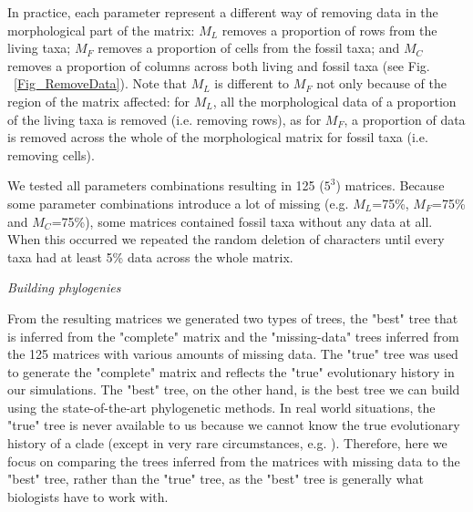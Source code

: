 \documentclass[12pt,letterpaper]{article}
\renewcommand{\subsection}[1]{%
\bigskip
\begin{center}
\begin{large}
\normalfont\itshape #1
\end{large}
\end{center}}
\begin{document}
In practice, each parameter represent a different way of removing data in the morphological part of the matrix: $M_{L}$ removes a proportion of rows from the living taxa; $M_{F}$ removes a proportion of cells from the fossil taxa; and $M_{C}$ removes a proportion of columns across both living and fossil taxa (see Fig. ~\ref{Fig_RemoveData}).
Note that $M_{L}$ is different to $M_{F}$ not only because of the region of the matrix affected: for $M_{L}$, all the morphological data of a proportion of the living taxa is removed (i.e. removing rows), as for $M_{F}$, a proportion of data is removed across the whole of the morphological matrix for fossil taxa (i.e. removing cells).

We tested all parameters combinations resulting in 125 ($5^3$) matrices.
Because some parameter combinations introduce a lot of missing (e.g. $M_L$=75\%, $M_F$=75\% and $M_C$=75\%), some matrices contained fossil taxa without any data at all.
When this occurred we repeated the random deletion of characters until every taxa had at least 5\% data across the whole matrix.


\subsection{Building phylogenies}
From the resulting matrices we generated two types of trees, the "best" tree that is inferred from the "complete" matrix and the "missing-data" trees inferred from the 125 matrices with various amounts of missing data.
The "true" tree was used to generate the "complete" matrix and reflects the "true" evolutionary history in our simulations.
The "best" tree, on the other hand, is the best tree we can build using the state-of-the-art phylogenetic methods.
In real world situations, the "true" tree is never available to us because we cannot know the true evolutionary history of a clade (except in very rare circumstances, e.g. \citet{rozen2005}).
Therefore, here we focus on comparing the trees inferred from the matrices with missing data to the "best" tree, rather than the "true" tree, as the "best" tree is generally what biologists have to work with.
\end{document}
